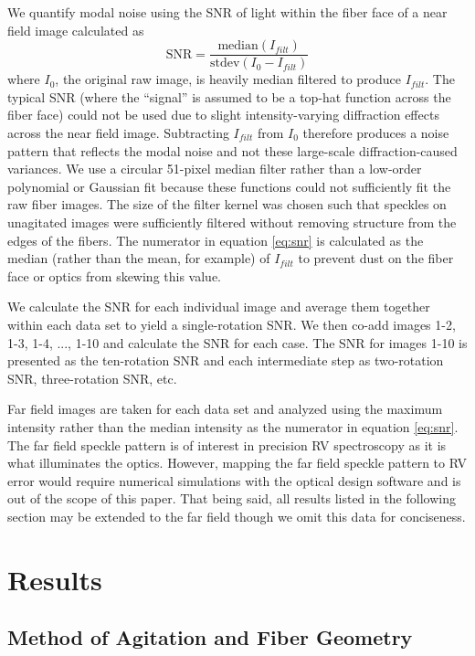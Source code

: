 \documentclass[twocolumn]{emulateapj}
\begin{document}
We quantify modal noise using the SNR of light within the fiber face of a near field image calculated as
\begin{equation}
\mathrm{SNR} = \frac{\mathrm{median}(I_{filt})}{\mathrm{stdev}(I_0 - I_{filt})}
\label{eq:snr}
\end{equation}
where $I_0$, the original raw image, is heavily median filtered to produce $I_{filt}$. The typical SNR (where the ``signal'' is assumed to be a top-hat function across the fiber face) could not be used due to slight intensity-varying diffraction effects across the near field image. Subtracting $I_{filt}$ from $I_0$ therefore produces a noise pattern that reflects the modal noise and not these large-scale diffraction-caused variances. We use a circular 51-pixel median filter rather than a low-order polynomial or Gaussian fit because these functions could not sufficiently fit the raw fiber images. The size of the filter kernel was chosen such that speckles on unagitated images were sufficiently filtered without removing structure from the edges of the fibers. The numerator in equation \ref{eq:snr} is calculated as the median (rather than the mean, for example) of $I_{filt}$ to prevent dust on the fiber face or optics from skewing this value.

We calculate the SNR for each individual image and average them together within each data set to yield a single-rotation SNR. We then co-add images 1-2, 1-3, 1-4, ..., 1-10 and calculate the SNR for each case. The SNR for images 1-10 is presented as the ten-rotation SNR and each intermediate step as two-rotation SNR, three-rotation SNR, etc.

Far field images are taken for each data set and analyzed using the maximum intensity rather than the median intensity as the numerator in equation \ref{eq:snr}. The far field speckle pattern is of interest in precision RV spectroscopy as it is what illuminates the optics. However, mapping the far field speckle pattern to RV error would require numerical simulations with the optical design software and  is out of the scope of this paper. That being said, all results listed in the following section may be extended to the far field though we omit this data for conciseness.

\section{Results}
\label{sec:results}

\subsection{Method of Agitation and Fiber Geometry}
\end{document}
